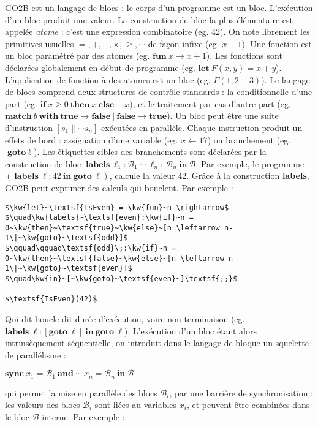 \documentclass[11pt]{article}
\newcommand{\kw}[1]{\textbf{#1}}
\newcommand{\Block}{\mathcal{B}}
\begin{document}
\textsf{GO2B} est un langage de blocs : le corps d'un 
programme est un bloc. L'exécution d'un bloc produit 
une valeur. La construction de bloc la plus élémentaire 
est appelée \emph{atome} : c'est une expression combinatoire 
(eg. $42$). On note librement les  primitives usuelles 
$=, +,-, \times, \ge, \cdots$ de façon infixe (eg. $x + 1$). 
Une fonction est un bloc paramétré par des atomes 
(eg. $\kw{fun}~x \rightarrow x + 1$). Les fonctions sont déclarées 
globalement en début de programme  (eg. $\kw{let}~F(x,y) = x + y$). 
L'application de fonction à des atomes est un bloc (eg. $F(1,2+3)$). 
Le langage de blocs comprend deux structures de contrôle standards : 
la conditionnelle d'une part (eg. $\kw{if}~x \ge 0~\kw{then}~x~\kw{else} -x)$, 
et le traitement par cas d'autre part (eg. $\kw{match}~b~\kw{with}~\kw{true} \rightarrow \kw{false}~|~\kw{false} \rightarrow \kw{true}$).
Un bloc peut être une suite d'instruction $[s_1 \| \cdots s_n]$ 
exécutées en parallèle. Chaque instruction produit un 
effets de bord : assignation d'une variable (eg. $x \leftarrow 17$) 
ou branchement (eg. $\kw{goto}~\ell$). Les étiquettes cibles des 
branchements sont déclarées par la construction de bloc $~\kw{labels}~\ell_1:\Block_1~\cdots~\ell_n:~\Block_n~\kw{in}~\Block$. Par exemple, 
le programme $(~\kw{labels}~\ell:42~\kw{in}~\kw{goto}~\ell)$, calcule 
la valeur 42.
Grâce à la construction \kw{labels}, \textsf{GO2B} peut exprimer 
des calculs qui bouclent.
\newpage
Par exemple :

\begin{lstlisting}
$\kw{let}~\textsf{IsEven} = \kw{fun}~n \rightarrow$
$\quad\kw{labels}~\textsf{even}:\kw{if}~n = 0~\kw{then}~\textsf{true}~\kw{else}~[n \leftarrow n-1\|~\kw{goto}~\textsf{odd}]$
$\qquad\qquad\textsf{odd}\;:\kw{if}~n = 0~\kw{then}~\textsf{false}~\kw{else}~[n \leftarrow n-1\|~\kw{goto}~\textsf{even}]$
$\quad\kw{in}~[~\kw{goto}~\textsf{even}~]\textsf{;;}$

$\textsf{IsEven}(42)$
\end{lstlisting}

Qui dit boucle dit durée d'exécution, voire non-terminaison 
(eg. $\kw{labels}~\ell:[\kw{goto}~\ell]~\kw{in}~\kw{goto}~\ell$). 
L'exécution d'un bloc étant alors intrinsèquement séquentielle, 
on introduit dans le langage de bloque un squelette de parallélisme :
\begin{center}
$\kw{sync}~x_1 = \Block_1~\kw{and}~\cdots~x_n = \Block_n~\kw{in}~\Block$
\end{center}

qui permet la mise en parallèle des blocs $\Block_i$, 
par une barrière de synchronisation : les valeurs 
des blocs $\Block_i$ sont liées au variables $x_i$, 
et peuvent être combinées dans le bloc $\Block$ interne.
Par exemple :
\end{document}
